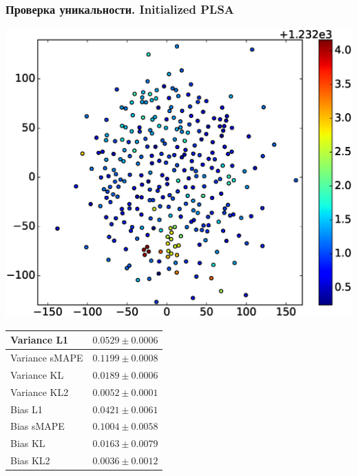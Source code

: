 \documentclass[utf8]{beamer}
\begin{document}
	
	\begin{frame}	
	\fontsize{10pt}{9.2}\selectfont
	\frametitle{Проверка уникальности. Initialized PLSA}
	 \includegraphics[width=0.45\linewidth]{presentation_pictures/full_initialized_plsa.eps} 
    \begin{tabular}[b]{| l | l | }\hline
      Variance L1 & $0.0529 \pm 0.0006$ \\ \hline
      Variance sMAPE  & $0.1199 \pm 0.0008$ \\ \hline
      Variance KL  & $0.0189 \pm 0.0006 $ \\ \hline
      Variance KL2  & $0.0052 \pm 0.0001$ \\ \hline

      Bias L1 & $0.0421 \pm 0.0061$ \\ \hline
      Bias sMAPE  & $0.1004 \pm 0.0058$ \\ \hline
      Bias KL  & $0.0163 \pm 0.0079$ \\ \hline
      Bias KL2  & $0.0036 \pm 0.0012$ \\ \hline
    \end{tabular}

	\end{frame}
	
\end{document}
